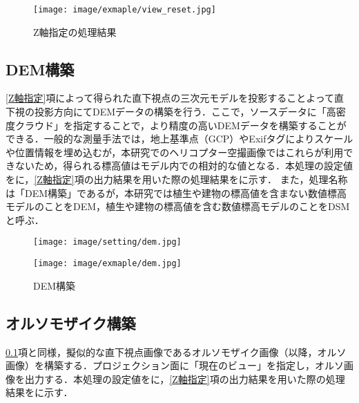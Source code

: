       \begin{figure}[t]
        \centering
        \texttt{[image: image/exmaple/view\_reset.jpg]}
        \caption{Z軸指定の処理結果}
        \label{Z軸指定結果}
      \end{figure}

    \subsection{DEM構築}
      \label{DEM構築}
      \ref{Z軸指定}項によって得られた直下視点の三次元モデルを投影することよって直下視の投影方向にてDEMデータの構築を行う．ここで，ソースデータに「高密度クラウド」を指定することで，より精度の高いDEMデータを構築することができる．一般的な測量手法では，地上基準点（GCP）やExifタグによりスケールや位置情報を埋め込むが，本研究でのヘリコプター空撮画像ではこれらが利用できないため，得られる標高値はモデル内での相対的な値となる．本処理の設定値をに，\ref{Z軸指定}項の出力結果を用いた際の処理結果をに示す．
      また，処理名称は「DEM構築」であるが，本研究では植生や建物の標高値を含まない数値標高モデルのことをDEM，植生や建物の標高値を含む数値標高モデルのことをDSMと呼ぶ．

      \begin{figure}[t]
        \begin{minipage}[c]{0.45\hsize}
          \centering
          \texttt{[image: image/setting/dem.jpg]}
          \label{DEM構築設定値}
        \end{minipage}
        \begin{minipage}[c]{0.45\hsize}
          \centering
          \texttt{[image: image/exmaple/dem.jpg]}
          \label{DEM構築結果}
        \end{minipage}
        \caption{DEM構築}
      \end{figure}

    \subsection{オルソモザイク構築}
      \label{オルソモザイク構築}
      \ref{DEM構築}項と同様，擬似的な直下視点画像であるオルソモザイク画像（以降，オルソ画像）を構築する．プロジェクション面に「現在のビュー」を指定し，オルソ画像を出力する．本処理の設定値をに，\ref{Z軸指定}項の出力結果を用いた際の処理結果をに示す．

